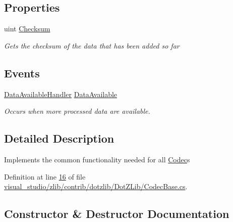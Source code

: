 \subsection*{Properties}
\begin{DoxyCompactItemize}
\item 
uint \hyperlink{class_dot_z_lib_1_1_codec_base_a3d3d33386fbbfcdc84c5f566a1d302cc}{Checksum}
\begin{DoxyCompactList}\small\item\em Gets the checksum of the data that has been added so far \end{DoxyCompactList}\end{DoxyCompactItemize}
\subsection*{Events}
\begin{DoxyCompactItemize}
\item 
\hyperlink{namespace_dot_z_lib_a13a751b897fc2af0be2307e4deb7eb1c}{Data\+Available\+Handler} \hyperlink{class_dot_z_lib_1_1_codec_base_ad7ec5a193ad07d7c91d2538c51eb33c1}{Data\+Available}
\begin{DoxyCompactList}\small\item\em Occurs when more processed data are available. \end{DoxyCompactList}\end{DoxyCompactItemize}


\subsection{Detailed Description}
Implements the common functionality needed for all \hyperlink{interface_dot_z_lib_1_1_codec}{Codec}s 



Definition at line \hyperlink{visual__studio_2zlib_2contrib_2dotzlib_2_dot_z_lib_2_codec_base_8cs_source_l00016}{16} of file \hyperlink{visual__studio_2zlib_2contrib_2dotzlib_2_dot_z_lib_2_codec_base_8cs_source}{visual\+\_\+studio/zlib/contrib/dotzlib/\+Dot\+Z\+Lib/\+Codec\+Base.\+cs}.



\subsection{Constructor \& Destructor Documentation}
\mbox{\label{class_dot_z_lib_1_1_codec_base_a1e372f5061c8f7c16a55bc41c55ebfa5}} 
